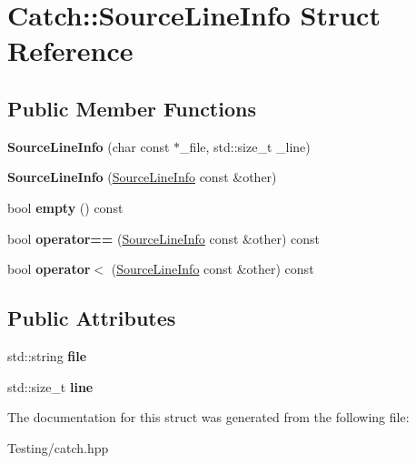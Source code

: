 \hypertarget{struct_catch_1_1_source_line_info}{\section{Catch\-:\-:Source\-Line\-Info Struct Reference}
\label{struct_catch_1_1_source_line_info}
}
\subsection*{Public Member Functions}
\begin{DoxyCompactItemize}
\item 
\hypertarget{struct_catch_1_1_source_line_info_a6218cb890337d37f708ea94063958940}{{\bfseries Source\-Line\-Info} (char const $\ast$\-\_\-file, std\-::size\-\_\-t \-\_\-line)}\label{struct_catch_1_1_source_line_info_a6218cb890337d37f708ea94063958940}

\item 
\hypertarget{struct_catch_1_1_source_line_info_a1ec99cc0547ce5909133aaa8f14ed4b1}{{\bfseries Source\-Line\-Info} (\hyperlink{struct_catch_1_1_source_line_info}{Source\-Line\-Info} const \&other)}\label{struct_catch_1_1_source_line_info_a1ec99cc0547ce5909133aaa8f14ed4b1}

\item 
\hypertarget{struct_catch_1_1_source_line_info_a9a25ffc0640d1a3dd0c9b7e5fcbba7b9}{bool {\bfseries empty} () const }\label{struct_catch_1_1_source_line_info_a9a25ffc0640d1a3dd0c9b7e5fcbba7b9}

\item 
\hypertarget{struct_catch_1_1_source_line_info_af0854821b1abfda52796ef0f1294b050}{bool {\bfseries operator==} (\hyperlink{struct_catch_1_1_source_line_info}{Source\-Line\-Info} const \&other) const }\label{struct_catch_1_1_source_line_info_af0854821b1abfda52796ef0f1294b050}

\item 
\hypertarget{struct_catch_1_1_source_line_info_a581c02d683808232168bfc2e775c3554}{bool {\bfseries operator$<$} (\hyperlink{struct_catch_1_1_source_line_info}{Source\-Line\-Info} const \&other) const }\label{struct_catch_1_1_source_line_info_a581c02d683808232168bfc2e775c3554}

\end{DoxyCompactItemize}
\subsection*{Public Attributes}
\begin{DoxyCompactItemize}
\item 
\hypertarget{struct_catch_1_1_source_line_info_adf3ccf0c2bd326eb3466318af82a94dd}{std\-::string {\bfseries file}}\label{struct_catch_1_1_source_line_info_adf3ccf0c2bd326eb3466318af82a94dd}

\item 
\hypertarget{struct_catch_1_1_source_line_info_a841e5d696c7b9cde24e45e61dd979c77}{std\-::size\-\_\-t {\bfseries line}}\label{struct_catch_1_1_source_line_info_a841e5d696c7b9cde24e45e61dd979c77}

\end{DoxyCompactItemize}


The documentation for this struct was generated from the following file\-:\begin{DoxyCompactItemize}
\item 
Testing/catch.\-hpp\end{DoxyCompactItemize}
